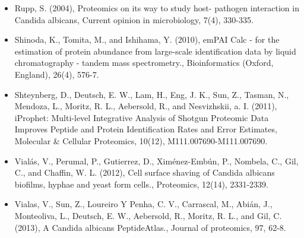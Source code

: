 \begin{itemize}
\item[]{%
Rupp, S. (2004), Proteomics on its way to study host- pathogen interaction in Candida albicans,
 Current opinion in microbiology, 7(4), 330-335.
}

\item[]{%
Shinoda, K., Tomita, M., and Ishihama, Y. (2010), 
emPAI Calc - for the estimation of protein abundance from large-scale
identification data by liquid chromatography - tandem mass spectrometry.,
Bioinformatics (Oxford, England), 26(4), 576-7.
}

\item[]{%
Shteynberg, D., Deutsch, E. W., Lam, H., Eng, J. K., Sun, Z., Tasman, N., Mendoza, L., Moritz,
R. L., Aebersold, R., and Nesvizhskii, a. I. (2011), iProphet: Multi-level Integrative Analysis
of Shotgun Proteomic Data Improves Peptide and Protein Identification Rates and Error
Estimates, Molecular \& Cellular Proteomics, 10(12), M111.007690-M111.007690.
}


\item[]{%
Vial\'as, V., Perumal, P., Gutierrez, D., Xim\'enez-Emb\'un, P., Nombela, C., Gil, C., and Chaffin,
W. L. (2012), Cell surface shaving of Candida albicans biofilms, hyphae and yeast form
cells., Proteomics, 12(14), 2331-2339.
}

\item[]{%
Vialas, V., Sun, Z., Loureiro Y Penha, C. V., Carrascal, M., Abi\'an, J., Monteoliva, L., Deutsch,
E. W., Aebersold, R., Moritz, R. L., and Gil, C. (2013), A Candida albicans PeptideAtlas.,
Journal of proteomics, 97, 62-8.
}


\end{itemize}
